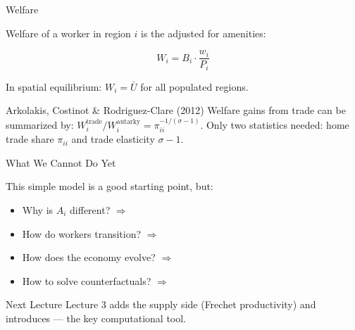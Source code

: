 \documentclass{beamer}
\begin{document}
\begin{frame}{Welfare}

    Welfare of a worker in region $i$ is the  adjusted for amenities:

    \[ W_i = B_i \cdot \frac{w_i}{P_i} \]

    In spatial equilibrium: $W_i = \bar{U}$ for all populated regions.

    \vspace{0.2em}
    \begin{exampleblock}{Arkolakis, Costinot \& Rodriguez-Clare (2012)}
        Welfare gains from trade can be summarized by:
        $W_i^{\text{trade}} / W_i^{\text{autarky}} = \pi_{ii}^{-1/(\sigma-1)}$.
        Only two statistics needed: home trade share $\pi_{ii}$ and trade elasticity $\sigma - 1$.
    \end{exampleblock}


\end{frame}

\begin{frame}{What We Cannot Do Yet}

    This simple model is a good starting point, but:

    \vspace{0.3em}
    \begin{itemize}
        \item {} Why is $A_i$ different? $\Rightarrow$ 
        \item {} How do workers transition? $\Rightarrow$ 
        \item {} How does the economy evolve? $\Rightarrow$ 
        \item {} How to solve counterfactuals? $\Rightarrow$ 
    \end{itemize}

    \vspace{0.5em}
    \begin{block}{Next Lecture}
        Lecture 3 adds the  supply side (Frechet productivity) and introduces  --- the key computational tool.
    \end{block}

\end{frame}
\end{document}

